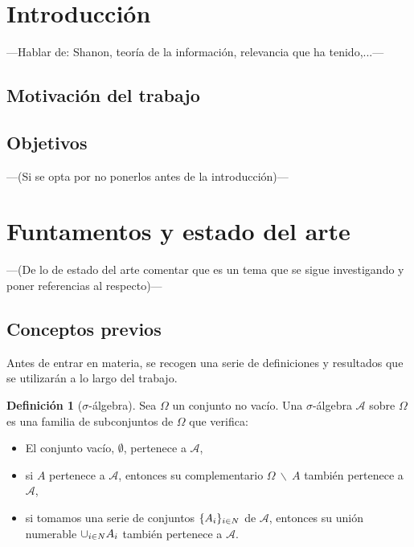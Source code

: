 \documentclass[10pt,a4paper]{article} %
\let\mathbb\relax
\theoremstyle{definition}
\newtheorem{definition}{Definición}[section]
\begin{document}
\tableofcontents
\newpage

\section{Introducción}

---Hablar de: Shanon, teoría de la información, relevancia que ha tenido,...---
\subsection{Motivación del trabajo}
\subsection{Objetivos}
---(Si se opta por no ponerlos antes de la introducción)---

\section{Funtamentos y estado del arte}

---(De lo de estado del arte comentar que es un tema que se sigue investigando y poner referencias al respecto)---

\subsection{Conceptos previos}

Antes de entrar en materia, se recogen una serie de definiciones y resultados que se utilizarán a lo largo del trabajo.

\begin{definition}[$\sigma$-álgebra]
  Sea $\Omega$ un conjunto no vacío. Una $\sigma$-álgebra $\mathcal{A}$ sobre $\Omega$ es una familia de subconjuntos de $\Omega$ que verifica:
  \begin{itemize}
  \item  El conjunto vacío, $\emptyset$, pertenece a $\mathcal{A}$,
  \item  si $A$ pertenece a $\mathcal{A}$, entonces su complementario $\Omega\ \backslash\ A$ también pertenece a $\mathcal{A}$,
 \item si tomamos una serie de conjuntos $\{A_i\}_{i\in \mathbb{N}}$ de $\mathcal{A}$, entonces su unión numerable $\cup_{i\in \mathbb{N}}A_i$ también pertenece a $\mathcal{A}$.
  \end{itemize}
  
\end{definition}
\end{document}
